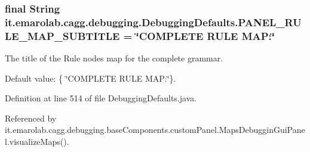 \hypertarget{classit_1_1emarolab_1_1cagg_1_1debugging_1_1DebuggingDefaults_aa8de8cb1e7960c283cdb7f735c9e23e1}{
\subsubsection[{P\-A\-N\-E\-L\-\_\-\-R\-U\-L\-E\-\_\-\-M\-A\-P\-\_\-\-S\-U\-B\-T\-I\-T\-L\-E}]{\setlength{\rightskip}{0pt plus 5cm}final String it.\-emarolab.\-cagg.\-debugging.\-Debugging\-Defaults.\-P\-A\-N\-E\-L\-\_\-\-R\-U\-L\-E\-\_\-\-M\-A\-P\-\_\-\-S\-U\-B\-T\-I\-T\-L\-E = \char`\"{}C\-O\-M\-P\-L\-E\-T\-E R\-U\-L\-E M\-A\-P\-:\char`\"{}\hspace{0.3cm}{\ttfamily [static]}}}\label{classit_1_1emarolab_1_1cagg_1_1debugging_1_1DebuggingDefaults_aa8de8cb1e7960c283cdb7f735c9e23e1}
The title of the Rule nodes map for the complete grammar.\par
 Default value\-: \{ \char`\"{}\-C\-O\-M\-P\-L\-E\-T\-E R\-U\-L\-E M\-A\-P\-:\char`\"{}\}. 

Definition at line 514 of file Debugging\-Defaults.\-java.



Referenced by it.\-emarolab.\-cagg.\-debugging.\-base\-Components.\-custom\-Panel.\-Maps\-Debuggin\-Gui\-Panel.\-visualize\-Maps().


